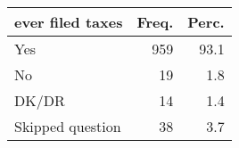 \begin{table}[ht]
\centering
\begin{tabular}{lrr}
  \hline
ever filed taxes & Freq. & Perc. \\ 
  \hline
Yes & 959 & 93.1 \\ 
  No & 19 & 1.8 \\ 
  DK/DR & 14 & 1.4 \\ 
  Skipped question & 38 & 3.7 \\ 
   \hline
\end{tabular}
\end{table}
